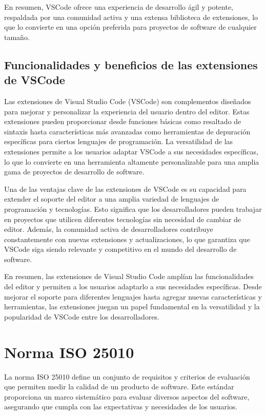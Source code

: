En resumen, VSCode ofrece una experiencia de desarrollo ágil y potente, respaldada por una comunidad activa y una extensa biblioteca de extensiones, lo que lo convierte en una opción preferida para proyectos de software de cualquier tamaño.

\subsection{Funcionalidades y beneficios de las extensiones de VSCode}
Las extensiones de Visual Studio Code (VSCode) son complementos diseñados para mejorar y personalizar la experiencia del usuario dentro del editor. Estas extensiones pueden proporcionar desde funciones básicas como resaltado de sintaxis hasta características más avanzadas como herramientas de depuración específicas para ciertos lenguajes de programación. La versatilidad de las extensiones permite a los usuarios adaptar VSCode a sus necesidades específicas, lo que lo convierte en una herramienta altamente personalizable para una amplia gama de proyectos de desarrollo de software.

Una de las ventajas clave de las extensiones de VSCode es su capacidad para extender el soporte del editor a una amplia variedad de lenguajes de programación y tecnologías. Esto significa que los desarrolladores pueden trabajar en proyectos que utilicen diferentes tecnologías sin necesidad de cambiar de editor. Además, la comunidad activa de desarrolladores contribuye constantemente con nuevas extensiones y actualizaciones, lo que garantiza que VSCode siga siendo relevante y competitivo en el mundo del desarrollo de software. \parencite{Nandwana2023}

En resumen, las extensiones de Visual Studio Code amplían las funcionalidades del editor y permiten a los usuarios adaptarlo a sus necesidades específicas. Desde mejorar el soporte para diferentes lenguajes hasta agregar nuevas características y herramientas, las extensiones juegan un papel fundamental en la versatilidad y la popularidad de VSCode entre los desarrolladores.

\section{Norma ISO 25010}
La norma ISO 25010 define un conjunto de requisitos y criterios de evaluación que permiten medir la calidad de un producto de software. Este estándar proporciona un marco sistemático para evaluar diversos aspectos del software, asegurando que cumpla con las expectativas y necesidades de los usuarios. \parencite{Ormeño2019}

